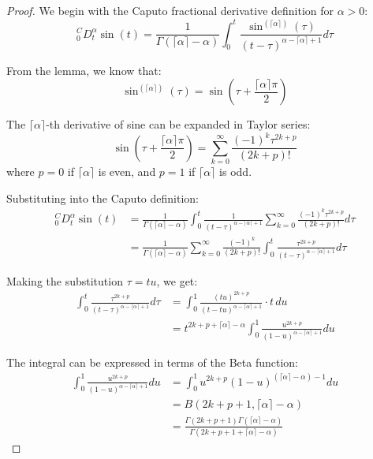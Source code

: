 \documentclass{article}
\begin{document}
\begin{proof}
We begin with the Caputo fractional derivative definition for $\alpha > 0$:
\begin{equation}
_0^CD_t^\alpha \sin(t) = \frac{1}{\Gamma(\lceil \alpha \rceil - \alpha)} \int_0^t \frac{\sin^{(\lceil \alpha \rceil)}(\tau)}{(t-\tau)^{\alpha - \lceil \alpha \rceil + 1}} d\tau
\end{equation}

From the lemma, we know that:
\begin{equation}
\sin^{(\lceil \alpha \rceil)}(\tau) = \sin\left(\tau + \frac{\lceil \alpha \rceil\pi}{2}\right)
\end{equation}

The $\lceil \alpha \rceil$-th derivative of sine can be expanded in Taylor series:
\begin{equation}
\sin\left(\tau + \frac{\lceil \alpha \rceil\pi}{2}\right) = \sum_{k=0}^{\infty} \frac{(-1)^k \tau^{2k+p}}{(2k+p)!}
\end{equation}
where $p = 0$ if $\lceil \alpha \rceil$ is even, and $p = 1$ if $\lceil \alpha \rceil$ is odd.

Substituting into the Caputo definition:
\begin{align}
_0^CD_t^\alpha \sin(t) &= \frac{1}{\Gamma(\lceil \alpha \rceil - \alpha)} \int_0^t \frac{1}{(t-\tau)^{\alpha - \lceil \alpha \rceil + 1}} \sum_{k=0}^{\infty} \frac{(-1)^k \tau^{2k+p}}{(2k+p)!} d\tau\\
&= \frac{1}{\Gamma(\lceil \alpha \rceil - \alpha)} \sum_{k=0}^{\infty} \frac{(-1)^k}{(2k+p)!} \int_0^t \frac{\tau^{2k+p}}{(t-\tau)^{\alpha - \lceil \alpha \rceil + 1}} d\tau
\end{align}

Making the substitution $\tau = tu$, we get:
\begin{align}
\int_0^t \frac{\tau^{2k+p}}{(t-\tau)^{\alpha - \lceil \alpha \rceil + 1}} d\tau &= \int_0^1 \frac{(tu)^{2k+p}}{(t-tu)^{\alpha - \lceil \alpha \rceil + 1}} \cdot t \, du\\
&= t^{2k+p+\lceil \alpha \rceil - \alpha} \int_0^1 \frac{u^{2k+p}}{(1-u)^{\alpha - \lceil \alpha \rceil + 1}} du
\end{align}

The integral can be expressed in terms of the Beta function:
\begin{align}
\int_0^1 \frac{u^{2k+p}}{(1-u)^{\alpha - \lceil \alpha \rceil + 1}} du &= \int_0^1 u^{2k+p} (1-u)^{(\lceil \alpha \rceil - \alpha) - 1} du\\
&= B(2k+p+1, \lceil \alpha \rceil - \alpha)\\
&= \frac{\Gamma(2k+p+1)\Gamma(\lceil \alpha \rceil - \alpha)}{\Gamma(2k+p+1+\lceil \alpha \rceil - \alpha)}
\end{align}


\end{proof}
\end{document}
